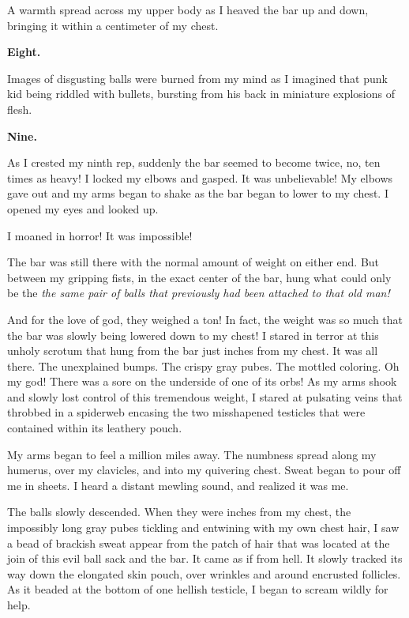 A warmth spread across my upper body as I heaved the bar up and
down, bringing it within a centimeter of my chest.



{\bf Eight.}



Images of disgusting balls were burned from my mind as I imagined
that punk kid being riddled with bullets, bursting from his back in
miniature explosions of flesh.



{\bf Nine.}



As I crested my ninth rep, suddenly the bar seemed to become twice,
no, ten times as heavy! I locked my elbows and gasped. It was
unbelievable! My elbows gave out and my arms began to shake as the
bar began to lower to my chest. I opened my eyes and looked
up.



I moaned in horror! It was impossible!



The bar was still there with the normal amount of weight on either
end. But between my gripping fists, in the exact center of the bar, hung
what could only be the {\em the same pair of balls that previously had
  been attached to that old man!}



And for the love of god, they weighed a ton! In fact, the weight
was so much that the bar was slowly being lowered down to my chest!
I stared in terror at this unholy scrotum that hung from the bar
just inches from my chest. It was all there. The unexplained bumps.
The crispy gray pubes. The mottled coloring. Oh my god! There was a
sore on the underside of one of its orbs! As my arms shook and
slowly lost control of this tremendous weight, I stared at
pulsating veins that throbbed in a spiderweb encasing the two
misshapened testicles that were contained within its leathery
pouch.



My arms began to feel a million miles away. The numbness spread
along my humerus, over my clavicles, and into my quivering chest.
Sweat began to pour off me in sheets. I heard a distant mewling
sound, and realized it was me.



The balls slowly descended. When they were inches from my chest,
the impossibly long gray pubes tickling and entwining with my own
chest hair, I saw a bead of brackish sweat appear from the patch of
hair that was located at the join of this evil ball sack and the
bar. It came as if from hell. It slowly tracked its way down the
elongated skin pouch, over wrinkles and around encrusted follicles.
As it beaded at the bottom of one hellish testicle, I began to
scream wildly for help.



